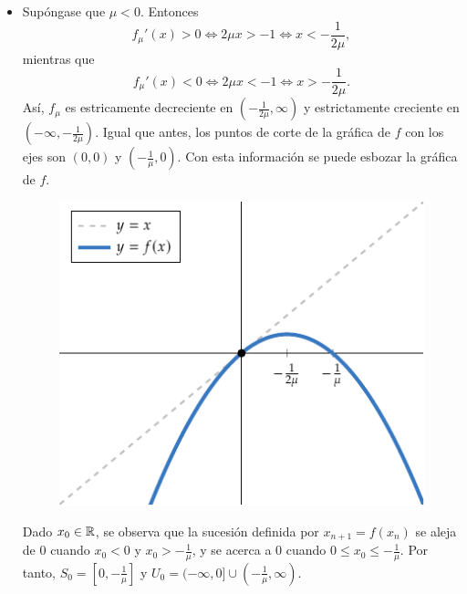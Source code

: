 \documentclass[11pt]{report}
\begin{document}
\begin{solution}
\begin{enumerate}
\begin{itemize}
\begin{figure}[H]
            \end{figure}
            Dado $x_0 \in \R$, se observa que la sucesión definida por $x_{n+1} = f(x_n)$ se aleja de $ 0$ cuando $x_0 > 0$ y $x_0 < -\frac{1}{\mu}$, y se acerca a $0$ cuando $-\frac{1}{\mu} \leq x_0 \leq 0$. Por tanto, $S_0 = [-\frac{1}{\mu},0]$ y $U_0 = (-\infty,-\frac{1}{\mu})\cup [0,\infty)$.
            \item Supóngase que $\mu < 0$. Entonces
            \[f_\mu'(x) > 0 \iff 2\mu x > -1 \iff x < -\frac{1}{2\mu},\]
            mientras que 
            \[f_\mu'(x) < 0 \iff 2\mu x < -1 \iff x > -\frac{1}{2\mu}.\]
            Así, $f_\mu$ es estricamente decreciente en $(-\frac{1}{2\mu},\infty)$ y estrictamente creciente en $(-\infty,-\frac{1}{2\mu})$. Igual que antes, los puntos de corte de la gráfica de $f$ con los ejes son $(0, 0)$ y $(-\frac{1}{\mu},0)$. Con esta información se puede esbozar la gráfica de $f$.
            \begin{figure}[H]
            \centering
            \includegraphics{./plot4/main.pdf}
            \end{figure}
            Dado $x_0 \in \R$, se observa que la sucesión definida por $x_{n+1} = f(x_n)$ se aleja de $ 0$ cuando $x_0 < 0$ y $x_0 > -\frac{1}{\mu}$, y se acerca a $0$ cuando $0 \leq x_0 \leq -\frac{1}{\mu}$. Por tanto, $S_0 = [0,-\frac{1}{\mu}]$ y $U_0 = (-\infty,0]\cup (-\frac{1}{\mu},\infty)$.
        \end{itemize}
    \end{enumerate}
\end{solution}
\end{document}
